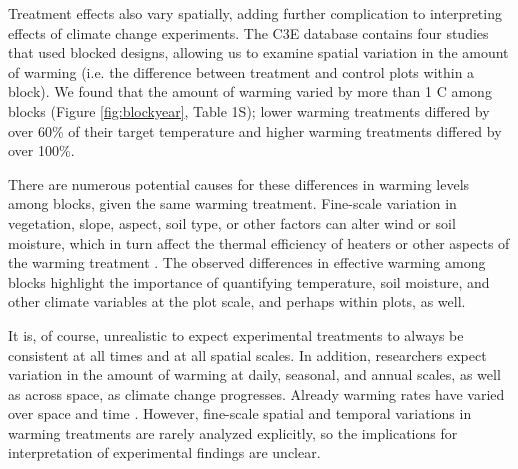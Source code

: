 \documentclass{article}
\begin{document}
\par Treatment effects also vary spatially, adding further complication to interpreting effects of climate change experiments. The C3E database contains four studies that used blocked designs, allowing us to examine spatial variation in the amount of warming (i.e. the difference between treatment and control plots within a block). We found that the amount of warming varied by more than 1 \degree C among blocks (Figure \ref{fig:blockyear}, Table 1S); lower warming treatments differed by over 60\% of their target temperature and higher warming treatments differed by over 100\%. %
\par There are numerous potential causes for these differences in warming levels among blocks, given the same warming treatment. Fine-scale variation in vegetation, slope, aspect, soil type, or other factors can alter wind or soil moisture, which in turn affect the thermal efficiency of heaters or other aspects of the warming treatment \citep{peterjohn1993,kimball2005,kimball2008,hoeppner2012,rollinson2015}. The observed differences in effective warming among blocks highlight the importance of quantifying temperature, soil moisture, and other climate variables at the plot scale, and perhaps within plots, as well. 

\par It is, of course, unrealistic to expect experimental treatments to always be consistent at all times and at all spatial scales. In addition, researchers expect variation in the amount of warming at daily, seasonal, and annual scales, as well as across space, as climate change progresses. Already warming rates have varied over space and time \citep{ipcc2013}. However, fine-scale spatial and temporal variations in warming treatments are rarely analyzed explicitly, so the implications for interpretation of experimental findings are unclear. %
\end{document}
